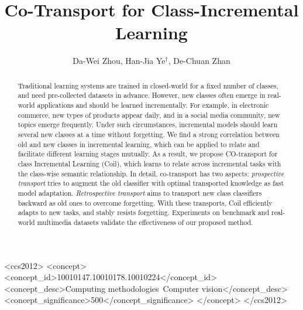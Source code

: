 \documentclass[sigconf]{acmart}
\newcommand{\name}{{\sc Coil }}
\newcommand{\mame}{{\sc Coil}}
\begin{document}
\title{Co-Transport for Class-Incremental Learning}



\author{Da-Wei Zhou, Han-Jia Ye$^\dagger$, De-Chuan Zhan}

\begin{abstract}
	
	
	Traditional learning systems are trained in closed-world for a fixed number of classes, and need pre-collected datasets in advance. 
	However, new classes often emerge in real-world applications and should be learned incrementally. For example, in electronic commerce, new types of products appear daily, and in a social media community, new topics emerge frequently.
	Under such circumstances, incremental models should learn several new classes at a time without forgetting.
	We find a strong correlation between old and new classes in incremental learning, which can be applied to relate and facilitate different learning stages mutually.
	As a result, we propose CO-transport for class Incremental Learning (\mame), which learns to relate across incremental tasks with the class-wise semantic relationship. 
	In detail, co-transport has two aspects: \emph{prospective transport} tries to augment the old classifier with optimal transported knowledge as fast model adaptation. 
	\emph{Retrospective transport} aims to transport new class classifiers backward as old ones to overcome  forgetting. 
	With these transports,  \name efficiently adapts to new tasks, and stably resists forgetting.
	Experiments on benchmark and real-world multimedia datasets validate the effectiveness of our proposed method.
\end{abstract}


\begin{CCSXML}
	<ccs2012>
	<concept>
	<concept_id>10010147.10010178.10010224</concept_id>
	<concept_desc>Computing methodologies~Computer vision</concept_desc>
	<concept_significance>500</concept_significance>
	</concept>
	</ccs2012>
\end{CCSXML}



\maketitle
{}
\end{document}
